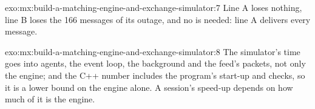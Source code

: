 \begin{solution}{exo:mx:build-a-matching-engine-and-exchange-simulator:7}
Line A loses nothing, line B loses the 166 messages of its outage, and no  is needed: line A delivers every message.
\end{solution}

\begin{solution}{exo:mx:build-a-matching-engine-and-exchange-simulator:8}
The simulator's time goes into agents, the event loop, the background and the feed's packets, not only the engine; and the C++ number includes the
program's start-up and checks, so it is a lower bound on the engine alone. A session's speed-up depends on how much of it is the engine.
\end{solution}

